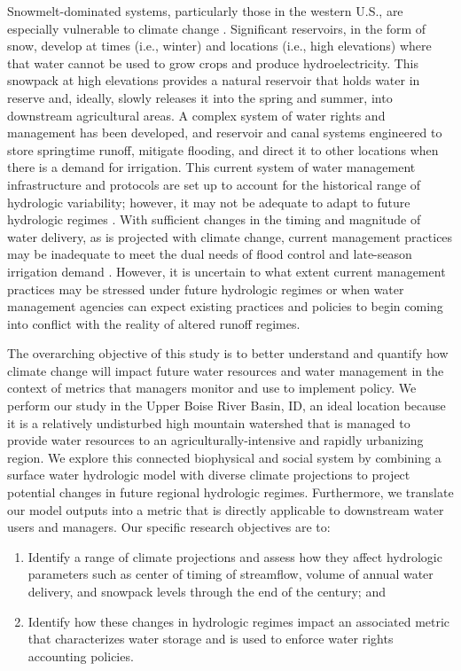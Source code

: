 \documentclass[11pt,letterpaper]{article}
\begin{document}
Snowmelt-dominated systems, particularly those in the western U.S., are especially vulnerable to climate change \citep{Barnett:2005ci,Stewart:2009jn,Li:2017jn}. Significant reservoirs, in the form of snow, develop at times (i.e., winter) and locations (i.e., high elevations) where that water cannot be used to grow crops and produce hydroelectricity. This snowpack at high elevations provides a natural reservoir that holds water in reserve and, ideally, slowly releases it into the spring and summer, into downstream agricultural areas. A complex system of water rights and management has been developed, and reservoir and canal systems engineered to store springtime runoff, mitigate flooding, and direct it to other locations when there is a demand for irrigation. This current system of water management infrastructure and protocols are set up to account for the historical range of hydrologic variability; however, it may not be adequate to adapt to future hydrologic regimes \citep{Palmer:2008dv}. With sufficient changes in the timing and magnitude of water delivery, as is projected with climate change, current management practices may be inadequate to meet the dual needs of flood control and late-season irrigation demand \citep{Barnett:2005ci}. However, it is uncertain to what extent current management practices may be stressed under future hydrologic regimes or when water management agencies can expect existing practices and policies to begin coming into conflict with the reality of altered runoff regimes. 

The overarching objective of this study is to better understand and quantify how climate change will impact future water resources and water management in the context of metrics that managers monitor and use to implement policy. We perform our study in the Upper Boise River Basin, ID, an ideal location because it is a relatively undisturbed high mountain watershed that is managed to provide water resources to an agriculturally-intensive and rapidly urbanizing region. We explore this connected biophysical and social system by combining a surface water hydrologic model with diverse climate projections to project potential changes in future regional hydrologic regimes. Furthermore, we translate our model outputs into a metric that is directly applicable to downstream water users and managers. Our specific research objectives are to:

\begin{enumerate}
\item Identify a range of climate projections and assess how they affect hydrologic parameters such as center of timing of streamflow, volume of annual water delivery, and snowpack levels through the end of the century; and
\item Identify how these changes in hydrologic regimes impact an associated metric that characterizes water storage and is used to enforce water rights accounting policies.
\end{enumerate}
\end{document}
